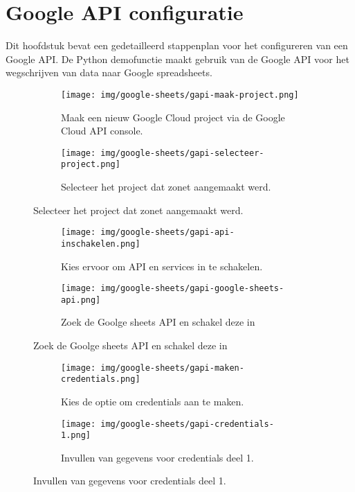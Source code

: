 \section{Google API configuratie}
\label{sec:google-api}
Dit hoofdstuk bevat een gedetailleerd stappenplan voor het configureren van een Google API. De Python demofunctie maakt gebruik van de Google API voor het wegschrijven van data naar Google spreadsheets.

\begin{figure}[h]
    \begin{subfigure}{0.5\textwidth}
        \texttt{[image: img/google-sheets/gapi-maak-project.png]}
        \captionsetup{width=0.8\linewidth}
        \centering
        \caption{Maak een nieuw Google Cloud project via de Google Cloud API console.}
    \end{subfigure}
    \begin{subfigure}{0.5\textwidth}
        \texttt{[image: img/google-sheets/gapi-selecteer-project.png]} 
        \captionsetup{width=0.8\linewidth}
        \centering
        \caption{Selecteer het project dat zonet aangemaakt werd.}
    \end{subfigure}
\end{figure}
\begin{figure}[h]\ContinuedFloat
    \begin{subfigure}{0.5\textwidth}
        \captionsetup{width=0.8\linewidth}
        \texttt{[image: img/google-sheets/gapi-api-inschakelen.png]} 
        \centering
        \caption{Kies ervoor om API en services in te schakelen.}
    \end{subfigure}
    \begin{subfigure}{0.5\textwidth}
        \captionsetup{width=0.8\linewidth}
        \texttt{[image: img/google-sheets/gapi-google-sheets-api.png]}
        \centering
        \caption{Zoek de Goolge sheets API en schakel deze in}
    \end{subfigure}
\end{figure}
\begin{figure}[h]\ContinuedFloat
    \begin{subfigure}{0.5\textwidth}
        \captionsetup{width=0.8\linewidth}
        \texttt{[image: img/google-sheets/gapi-maken-credentials.png]}
        \centering
        \caption{Kies de optie om credentials aan te maken.}
    \end{subfigure}
    \begin{subfigure}{0.5\textwidth}
        \captionsetup{width=0.8\linewidth}
        \texttt{[image: img/google-sheets/gapi-credentials-1.png]}
        \centering
        \caption{Invullen van gegevens voor credentials deel 1.}
    \end{subfigure}
\end{figure}
